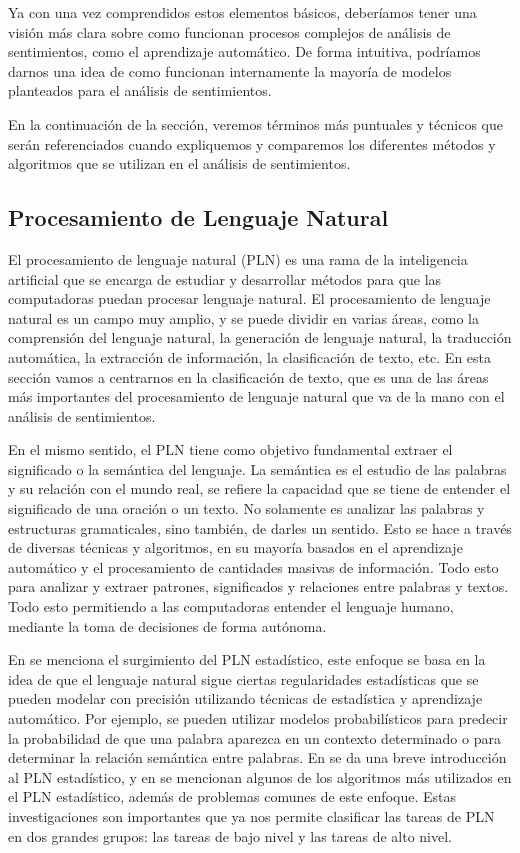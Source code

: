 \documentclass[12pt, conference]{IEEEtran}
\begin{document}
Ya con una vez comprendidos estos elementos básicos, deberíamos tener una visión más clara sobre como funcionan procesos complejos de análisis de sentimientos, como el aprendizaje automático. De forma intuitiva, podríamos darnos una idea de como funcionan internamente la mayoría de modelos planteados para el análisis de sentimientos.

En la continuación de la sección, veremos términos más puntuales y técnicos que serán referenciados cuando expliquemos y comparemos los diferentes métodos y algoritmos que se utilizan en el análisis de sentimientos.

\subsection{Procesamiento de Lenguaje Natural}

El procesamiento de lenguaje natural (PLN) es una rama de la inteligencia artificial que se encarga de estudiar y desarrollar métodos para que las computadoras puedan procesar lenguaje natural. 
El procesamiento de lenguaje natural es un campo muy amplio, y se puede dividir en varias áreas, como la comprensión del lenguaje natural, la generación de lenguaje natural, la traducción automática, la extracción de información, la clasificación de texto, etc. 
En esta sección vamos a centrarnos en la clasificación de texto, que es una de las áreas más importantes del procesamiento de lenguaje natural que va de la mano con el análisis de sentimientos.

En el mismo sentido, el PLN tiene como objetivo fundamental extraer el significado o la semántica del lenguaje. 
La semántica es el estudio de las palabras y su relación con el mundo real, se refiere la capacidad que se tiene de entender el significado de una oración o un texto. 
No solamente es analizar las palabras y estructuras gramaticales, sino también, de darles un sentido. 
Esto se hace a través de diversas técnicas y algoritmos, en su mayoría basados en el aprendizaje automático y el procesamiento de cantidades masivas de información. 
Todo esto para analizar y extraer patrones, significados y relaciones entre palabras y textos. 
Todo esto permitiendo a las computadoras entender el lenguaje humano, mediante la toma de decisiones de forma autónoma.

En \cite{b6} se menciona el surgimiento del PLN estadístico, este enfoque se basa en la idea de que el lenguaje natural sigue ciertas regularidades estadísticas que se pueden modelar con precisión utilizando técnicas de estadística y aprendizaje automático. 
Por ejemplo, se pueden utilizar modelos probabilísticos para predecir la probabilidad de que una palabra aparezca en un contexto determinado o para determinar la relación semántica entre palabras. 
En \cite{b7} se da una breve introducción al PLN estadístico, y en \cite{b8} se mencionan algunos de los algoritmos más utilizados en el PLN estadístico, además de problemas comunes de este enfoque. Estas investigaciones son importantes que ya nos permite clasificar las tareas de PLN en dos grandes grupos: las tareas de bajo nivel y las tareas de alto nivel.
\end{document}
